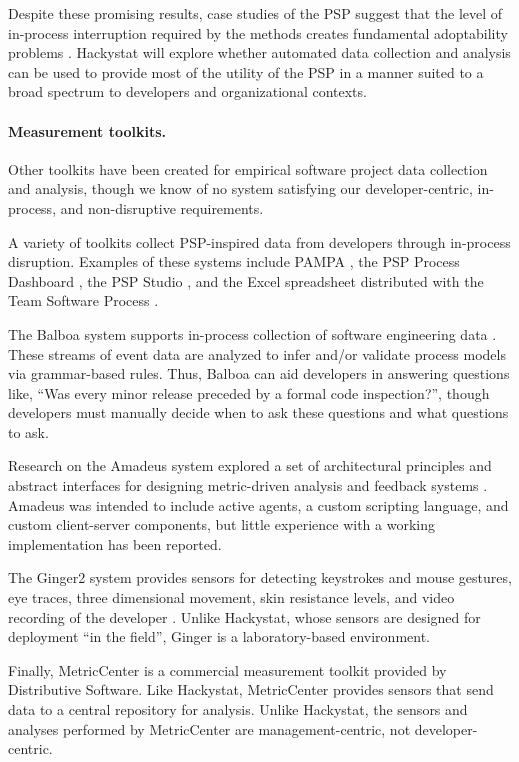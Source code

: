 Despite these promising results, case studies of the PSP suggest that the
level of in-process interruption required by the methods creates
fundamental adoptability problems \cite{csdl-98-13,Webb99}.  Hackystat will
explore whether automated data collection and analysis can be used to
provide most of the utility of the PSP in a manner suited to a broad
spectrum to developers and organizational contexts.

\vspace*{-.15in} \paragraph{Measurement toolkits.} 

Other toolkits have been created for empirical software project data
collection and analysis, though we know of no system satisfying our
developer-centric, in-process, and non-disruptive requirements.

A variety of toolkits collect PSP-inspired data from developers through
in-process disruption.  Examples of these systems include PAMPA
\cite{Simmons98}, the PSP Process Dashboard \cite{PSPDashboard}, the PSP
Studio \cite{PSPStudio}, and the Excel spreadsheet distributed with the Team
Software Process \cite{Humphrey00}.

The Balboa system supports in-process collection of 
software engineering data \cite{Cook98}.  These streams of event 
data are analyzed to infer and/or validate process models via
grammar-based rules. Thus, Balboa can aid developers
in answering questions like, ``Was every minor release preceded by a formal
code inspection?'', though developers must manually decide when to ask
these questions and what questions to ask. 

Research on the Amadeus system explored a set of architectural principles
and abstract interfaces for designing metric-driven analysis and feedback
systems \cite{Selby91}. Amadeus was intended to include
active agents, a custom scripting language, and custom client-server
components, but little experience with a working implementation has been
reported.

The Ginger2 system provides sensors for detecting keystrokes and mouse
gestures, eye traces, three dimensional movement, skin resistance levels,
and video recording of the developer \cite{Torii99}. Unlike Hackystat,
whose sensors are designed for deployment ``in the field'', Ginger is a
laboratory-based environment.

Finally, MetricCenter \cite{MetricCenter} is a commercial measurement
toolkit provided by Distributive Software. Like Hackystat, MetricCenter
provides sensors that send data to a central repository for analysis.
Unlike Hackystat, the sensors and analyses performed by MetricCenter are
management-centric, not developer-centric.

